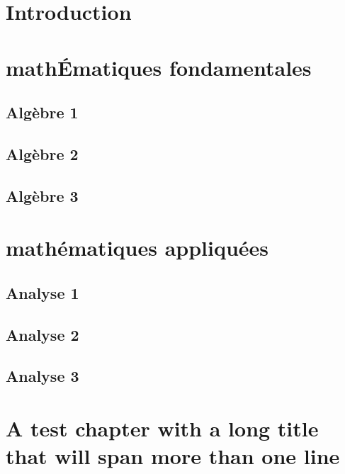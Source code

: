 \documentclass{book}
\begin{document}
\chapter*{Introduction}
\lipsum[4]

\chapter{math\'Ematiques fondamentales}
\lipsum[4]

\section{Alg\`ebre 1}
\section{Alg\`ebre 2}
\section{Alg\`ebre 3}
 
\chapter{math\'ematiques appliqu\'ees}
\lipsum[4]
\section{Analyse 1}
\section{Analyse 2}
\section{Analyse 3}

\chapter{A test chapter with a long title that will span more than one line}
\lipsum[4]
\end{document}
